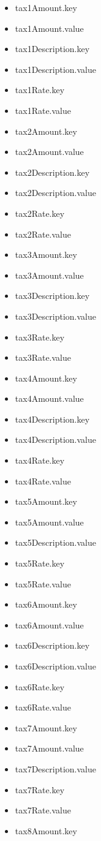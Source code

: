 \begin{multicols}{2}
\begin{itemize}
\item[] tax1Amount.key
\item[] tax1Amount.value
\item[] tax1Description.key
\item[] tax1Description.value
\item[] tax1Rate.key
\item[] tax1Rate.value
\item[] tax2Amount.key
\item[] tax2Amount.value
\item[] tax2Description.key
\item[] tax2Description.value
\item[] tax2Rate.key
\item[] tax2Rate.value
\item[] tax3Amount.key
\item[] tax3Amount.value
\item[] tax3Description.key
\item[] tax3Description.value
\item[] tax3Rate.key
\item[] tax3Rate.value
\item[] tax4Amount.key
\item[] tax4Amount.value
\item[] tax4Description.key
\item[] tax4Description.value
\item[] tax4Rate.key
\item[] tax4Rate.value
\item[] tax5Amount.key
\item[] tax5Amount.value
\item[] tax5Description.value
\item[] tax5Rate.key
\item[] tax5Rate.value
\item[] tax6Amount.key
\item[] tax6Amount.value
\item[] tax6Description.key
\item[] tax6Description.value
\item[] tax6Rate.key
\item[] tax6Rate.value
\item[] tax7Amount.key
\item[] tax7Amount.value
\item[] tax7Description.value
\item[] tax7Rate.key
\item[] tax7Rate.value
\item[] tax8Amount.key

\end{itemize}
\end{multicols}
